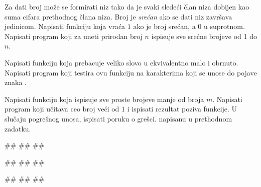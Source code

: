 \begin{Exercise}[label=v1.4_13] 
Za dati broj može se formirati niz tako da je svaki sledeći član niza
dobijen kao suma cifara prethodnog člana niza. Broj je \emph{srećan}
ako se dati niz završava jedinicom. Napisati funkciju  koja vraća $1$ ako je broj srećan, a $0$ u
suprotnom. Napisati program koji za uneti prirodan broj $n$ ispisuje
sve srećne brojeve od 1 do $n$.

\end{Exercise}
\begin{Answer}[ref=v1.4_13]
\end{Answer}

\begin{Exercise}[label=v1.4_14] 
Napisati funkciju  koja prebacuje veliko
slovo u ekvivalentno malo i obrnuto. Napisati program koji testira ovu
funkciju na karakterima koji se unose do pojave znaka .

\end{Exercise}
\begin{Answer}[ref=v1.4_14]
\end{Answer}


\begin{Exercise}[label=p1.4_] 
Napisati funkciju  koja ispisuje
sve proste brojeve manje od broja $m$.  Napisati program koji učitava
ceo broj veći od $1$ i ispisati rezultat poziva funkcije. U slučaju
pogrešnog unosa, ispisati poruku o grešci.  napisanu u prethodnom
zadatku.
 
\begin{miditest}
\begin{upotreba}{1}
#\naslovInt#
##
##
\end{upotreba}
\end{miditest}
\begin{miditest}
\begin{upotreba}{2}
#\naslovInt#
##
##
\end{upotreba}
\end{miditest}

\begin{miditest}
\begin{upotreba}{3}
#\naslovInt#
##
##
\end{upotreba}
\end{miditest}

\end{Exercise}


